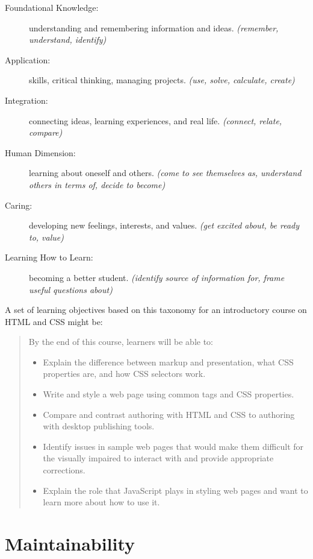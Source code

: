 \begin{description}
\item[Foundational Knowledge:]
understanding and remembering information and ideas. \emph{(remember,
understand, identify)}
\item[Application:]
skills, critical thinking, managing projects. \emph{(use, solve,
calculate, create)}
\item[Integration:]
connecting ideas, learning experiences, and real life. \emph{(connect,
relate, compare)}
\item[Human Dimension:]
learning about oneself and others. \emph{(come to see themselves as,
understand others in terms of, decide to become)}
\item[Caring:]
developing new feelings, interests, and values. \emph{(get excited about,
be ready to, value)}
\item[Learning How to Learn:]
becoming a better student. \emph{(identify source of information for,
frame useful questions about)}
\end{description}

A set of learning objectives based on this taxonomy for an
introductory course on HTML and CSS might be:

\begin{quote}
By the end of this course, learners will be able to:

\begin{itemize}
\item
  Explain the difference between markup and presentation, what CSS
  properties are, and how CSS selectors work.
\item
  Write and style a web page using common tags and CSS properties.
\item
  Compare and contrast authoring with HTML and CSS to authoring with
  desktop publishing tools.
\item
  Identify issues in sample web pages that would make them difficult
  for the visually impaired to interact with and provide appropriate
  corrections.
\item
  Explain the role that JavaScript plays in styling web pages and
  want to learn more about how to use it.
\end{itemize}
\end{quote}

\section{Maintainability}\label{s:process-maintainability}

